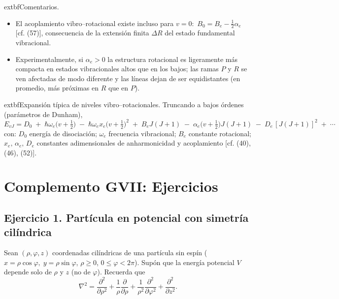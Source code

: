 \documentclass[a4paper,11pt]{article}
\begin{document}
	extbf{Comentarios.}
\begin{itemize}
	\item El acoplamiento vibro–rotacional existe incluso para $v=0$: $\,B_0= B_e-\tfrac12\alpha_e$ [cf. (57)], consecuencia de la extensión finita $\Delta R$ del estado fundamental vibracional.
	\item Experimentalmente, si $\alpha_e>0$ la estructura rotacional es ligeramente más compacta en estados vibracionales altos que en los bajos; las ramas $P$ y $R$ se ven afectadas de modo diferente y las líneas dejan de ser equidistantes (en promedio, más próximas en $R$ que en $P$).
\end{itemize}

	extbf{Expansión típica de niveles vibro–rotacionales.} Truncando a bajos órdenes (parámetros de Dunham),
\[
E_{vJ}= D_0\; +\; \hbar\omega_e\Big(v+\tfrac12\Big)\; -\; \hbar\omega_e x_e\Big(v+\tfrac12\Big)^2\; +\; B_e J(J+1)\; -\; \alpha_e\Big(v+\tfrac12\Big)J(J+1)\; -\; D_e\,[J(J+1)]^2\; +\; \cdots\tag{58}
\]
con: $D_0$ energía de disociación; $\omega_e$ frecuencia vibracional; $B_e$ constante rotacional; $x_e,\,\alpha_e,\,D_e$ constantes adimensionales de anharmonicidad y acoplamiento [cf. (40), (46), (52)].

\section*{Complemento GVII: Ejercicios}

\subsection*{Ejercicio 1. Partícula en potencial con simetría cilíndrica}
Sean $(\rho,\varphi,z)$ coordenadas cilíndricas de una partícula sin espín ($x=\rho\cos\varphi,\;y=\rho\sin\varphi$, $\rho\ge0$, $0\le\varphi<2\pi$). Supón que la energía potencial $V$ depende solo de $\rho$ y $z$ (no de $\varphi$). Recuerda que
\[
\nabla^2=\frac{\partial^2}{\partial \rho^2}+\frac{1}{\rho}\frac{\partial}{\partial \rho}+\frac{1}{\rho^2}\frac{\partial^2}{\partial \varphi^2}+\frac{\partial^2}{\partial z^2}.
\]
\end{document}
